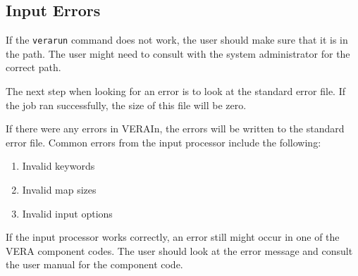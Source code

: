 \subsection{Input Errors}

If the {\tt verarun} command does not work, the user should make sure that it is in the path.
The user might need to consult with the system administrator for the correct path.

The next step when looking for an error is to look at the standard error file.
If the job ran successfully, the size of this file will be zero.

If there were any errors in VERAIn, the errors will be written to the standard error file.
Common errors from the input processor include the following:
\begin{enumerate}
\item Invalid keywords
\item Invalid map sizes
\item Invalid input options
\end{enumerate}

If the input processor works correctly, an error still might occur in one of the VERA component codes.
The user should look at the error message and consult the user manual for the component code.

